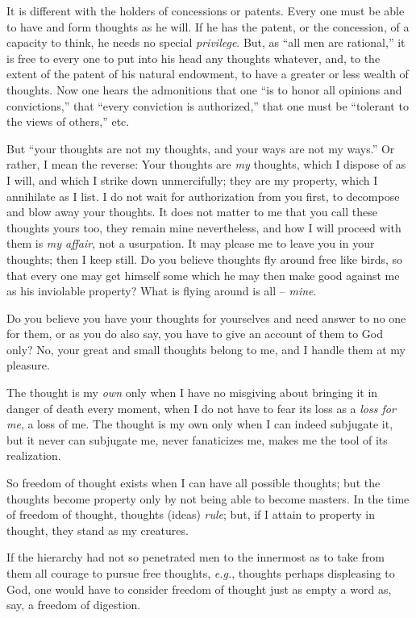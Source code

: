 \documentclass[12pt,a4paper]{book}
\begin{document}
It is different with the holders of concessions or patents. Every one must be 
able to have and form thoughts as he will. If he has the patent, or the 
concession, of a capacity to think, he needs no special \textit{privilege}. 
But, as ``all men are rational,'' it is free to every one to put into his 
head any thoughts whatever, and, to the extent of the patent of his natural 
endowment, to have a greater or less wealth of thoughts. Now one hears the 
admonitions that one ``is to honor all opinions and convictions,'' that 
``every conviction is authorized,'' that one must be ``tolerant to the 
views of others,'' etc.

But ``your thoughts are not my thoughts, and your ways are not my ways.'' Or 
rather, I mean the reverse: Your thoughts are \textit{my} thoughts, which I 
dispose of as I will, and which I strike down unmercifully; they are my 
property, which I annihilate as I list. I do not wait for authorization from 
you first, to decompose and blow away your thoughts. It does not matter to me 
that you call these thoughts yours too, they remain mine nevertheless, and how 
I will proceed with them is \textit{my affair}, not a usurpation. It may 
please me to leave you in your thoughts; then I keep still. Do you believe 
thoughts fly around free like birds, so that every one may get himself some 
which he may then make good against me as his inviolable property? What is 
flying around is all -- \textit{mine}.

Do you believe you have your thoughts for yourselves and need answer to no one 
for them, or as you do also say, you have to give an account of them to God 
only? No, your great and small thoughts belong to me, and I handle them at my 
pleasure.

The thought is my \textit{own} only when I have no misgiving about bringing it 
in danger of death every moment, when I do not have to fear its loss as a 
\textit{loss for me}, a loss of me. The thought is my own only when I can 
indeed subjugate it, but it never can subjugate me, never fanaticizes me, 
makes me the tool of its realization.

So freedom of thought exists when I can have all possible thoughts; but the 
thoughts become property only by not being able to become masters. In the time 
of freedom of thought, thoughts (ideas) \textit{rule}; but, if I attain to 
property in thought, they stand as my creatures.

If the hierarchy had not so penetrated men to the innermost as to take from 
them all courage to pursue free thoughts, \textit{e.g.}, thoughts perhaps 
displeasing to God, one would have to consider freedom of thought just as 
empty a word as, say, a freedom of digestion.
\end{document}
